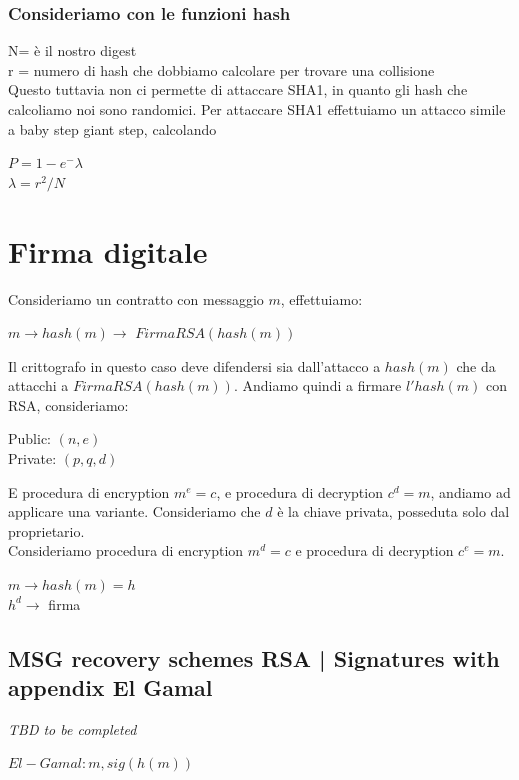 \documentclass[11pt, oneside]{article}   	%
\begin{document}
\subsubsection*{Consideriamo con le funzioni hash}
N= è il nostro digest\\
r = numero di hash che dobbiamo calcolare per trovare una collisione\\
Questo tuttavia non ci permette di attaccare SHA1, in quanto gli hash che calcoliamo noi sono randomici. Per attaccare SHA1 effettuiamo un attacco simile a baby step giant step, calcolando
\begin{center}
$P = 1 - e^-\lambda$\\
$\lambda = r^2/N$
\end{center}

\section*{Firma digitale}
Consideriamo un contratto con messaggio $m$, effettuiamo:
\begin{center}
$m \rightarrow hash(m) \rightarrow$ $Firma RSA(hash(m))$
\end{center}
Il crittografo in questo caso deve difendersi sia dall'attacco a $hash(m)$ che da attacchi a $Firma RSA(hash(m))$. Andiamo quindi a firmare $l'hash(m)$ con RSA, consideriamo:
\begin{center}
Public: $(n,e)$\\
Private: $(p, q, d)$
\end{center}
E procedura di encryption $m^e = c$, e procedura di decryption $c^d = m$, andiamo ad applicare una variante. Consideriamo che $d$ è la chiave privata, posseduta solo dal proprietario.\\
Consideriamo procedura di encryption $m^d = c$ e procedura di decryption $c^e = m$.
\begin{center}
$m \rightarrow hash(m) = h$\\
$h^d \rightarrow$ firma
\end{center}
\subsection*{MSG recovery schemes RSA | Signatures with appendix El Gamal}
\emph{TBD to be completed}
\begin{center}
$El-Gamal: m, sig (h(m))$\\
\end{center}
\end{document}

